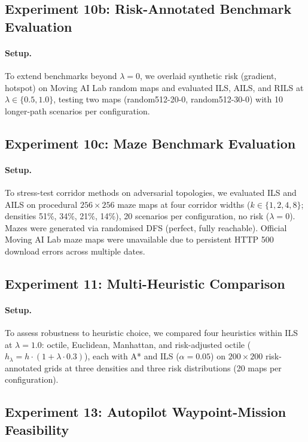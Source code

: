 \documentclass[11pt]{article}
\begin{document}
\subsection{Experiment 10b: Risk-Annotated Benchmark Evaluation}

\paragraph{Setup.}
To extend benchmarks beyond $\lambda = 0$, we overlaid synthetic risk (gradient, hotspot) on Moving AI Lab random maps and evaluated ILS, AILS, and RILS at $\lambda \in \{0.5, 1.0\}$, testing two maps (random512-20-0, random512-30-0) with 10 longer-path scenarios per configuration.

\subsection{Experiment 10c: Maze Benchmark Evaluation}

\paragraph{Setup.}
To stress-test corridor methods on adversarial topologies, we evaluated ILS and AILS on procedural $256 \times 256$ maze maps at four corridor widths ($k \in \{1, 2, 4, 8\}$; densities 51\%, 34\%, 21\%, 14\%), 20 scenarios per configuration, no risk ($\lambda = 0$). Mazes were generated via randomised DFS (perfect, fully reachable). Official Moving AI Lab maze maps were unavailable due to persistent HTTP 500 download errors across multiple dates.

\subsection{Experiment 11: Multi-Heuristic Comparison}

\paragraph{Setup.}
To assess robustness to heuristic choice, we compared four heuristics within ILS at $\lambda = 1.0$: octile, Euclidean, Manhattan, and risk-adjusted octile ($h_\lambda = h \cdot (1 + \lambda \cdot 0.3)$), each with A* and ILS ($\alpha = 0.05$) on $200 \times 200$ risk-annotated grids at three densities and three risk distributions (20 maps per configuration).

\subsection{Experiment 13: Autopilot Waypoint-Mission Feasibility}\label{subsec:exp13_setup}
\end{document}
